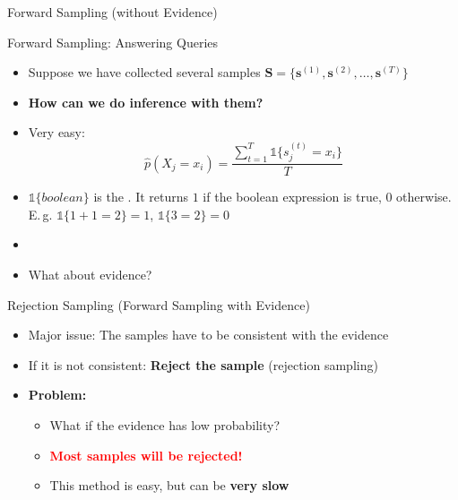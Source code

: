 \begin{frame}{Forward Sampling (without Evidence)}{}
	
\end{frame}


\begin{frame}{Forward Sampling: Answering Queries}{}
	\begin{itemize}
		\item Suppose we have collected several samples
			$\bm{S} = \{ \bm{s}^{(1)}, \bm{s}^{(2)}, \dots, \bm{s}^{(T)} \}$
		\item \textbf{How can we do inference with them?}
		\item Very easy:
		\begin{equation*}
			\widehat{p}(X_j = x_i) = \frac{\sum_{t=1}^T \mathbb{1}\{ s_j^{(t)} = x_i \}}{T}
		\end{equation*}
		\item $\mathbb{1}\{ boolean \}$ is the .
			It returns $1$ if the boolean expression is true, $0$ otherwise.
			E.\,g. $\mathbb{1}\{1+1=2\} = 1$, $\mathbb{1}\{3=2\} = 0$
		\item {}
		\item What about evidence?
	\end{itemize}
\end{frame}


\begin{frame}{Rejection Sampling (Forward Sampling with Evidence)}{}
	\begin{itemize}
		\item Major issue: The samples have to be consistent with the evidence
		\item If it is not consistent: \textbf{Reject the sample} (rejection sampling)
		\item \textbf{Problem:}
		\begin{itemize}
			\item What if the evidence has low probability?
			\item \textcolor{red}{\textbf{Most samples will be rejected!}}
			\item This method is easy, but can be \textbf{very slow}
		\end{itemize}
	\end{itemize}
\end{frame}


